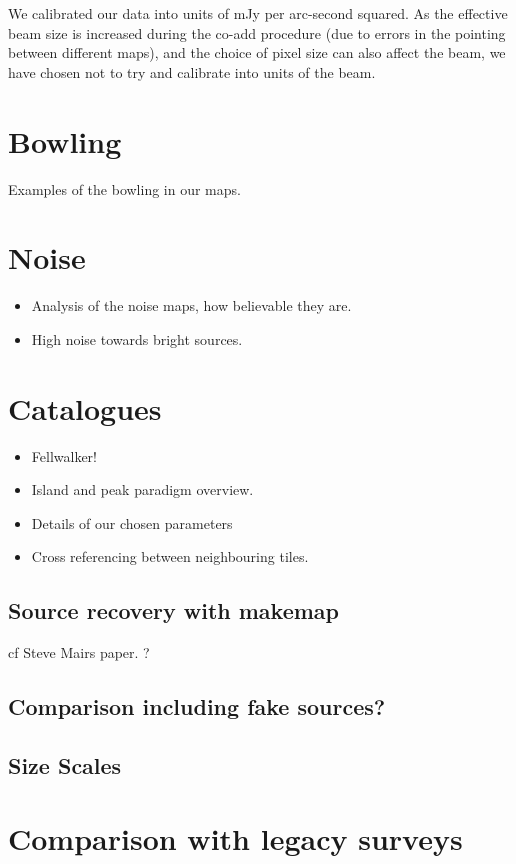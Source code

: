 \documentclass[usenatbib]{mn2e}
\begin{document}
We calibrated our data into units of mJy per arc-second squared.
As the effective beam size is increased during the co-add procedure
(due to errors in the pointing between different maps), and the choice
of pixel size can also affect the beam, we have chosen not to try and
calibrate into units of the beam.


\section{Bowling}
Examples of the bowling in our maps.

\section{Noise}
\begin{itemize}
\item Analysis of the noise maps, how believable they are.
\item High noise towards bright sources.
\end{itemize}



\section{Catalogues}
\begin{itemize}
\item Fellwalker! \citep{2015A&C....10...22B}
\item Island and peak paradigm overview.
\item Details of our chosen parameters
\item Cross referencing between neighbouring tiles.
\end{itemize}

\subsection{Source recovery with makemap}
cf Steve Mairs paper. \citep{2014ApJ...783...60M} ?

\subsection{Comparison including fake sources?}

\subsection{Size Scales}

\section{Comparison with legacy surveys}
\end{document}
